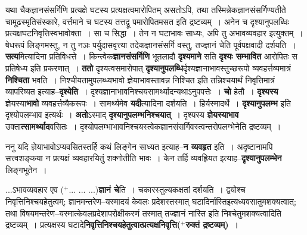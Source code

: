\documentclass[article,12pt,a4paper]{memoir}
\newcommand{\add}[1]{($^{+}$#1)}
\begin{document}
	यथा चैकज्ञानसंसर्गिणि प्रत्यक्षे घटस्य प्रत्यक्षत्वमारोपितम् असतोऽपि, तथा तस्मिन्नेकज्ञानसंसर्गिण्यतीते चामूढस्मृतिसंस्कारे, वर्त्तमाने च घटस्य तत्तद्रू पमारोपितमसत इति द्रष्टव्यम् । अनेन च दृश्यानुपलब्धिः प्रत्यक्षघटनिवृत्तिस्वभावोक्ता । सा च सिद्धा । तेन न घटाभावः साध्यः, अपि तु अभावव्यवहार इत्युक्तम् । षेधरूपं लिङ्गमस्तु, न तु नञः पर्युदासवृत्त्या तदेकज्ञानसंसर्गि वस्तु, तज्ज्ञानं चेति पूर्वपक्षवादी दर्शयति । \textbf{सत्य}मित्यादिना प्रतिविधत्ते । किन्त्वेक\textbf{ज्ञानसंसर्गिणि} भूतलादौ \textbf{दृश्यमाने} सति \textbf{दृश्यः सम्भावित} आरोपितः स प्रतिषेध्य इति प्रकरणात् । \textbf{ततो} दृश्यत्वसमारोपात् \textbf{दृश्यानुपलब्धि}र्दृश्यज्ञानाभावस्तुच्छरूपो व्यवहर्त्तव्यमात्रं \textbf{निश्चिता} भवति । निश्चीयतामुपलब्ध्यभावो ज्ञेयाभावस्तावन्न निश्चित इति तन्निश्चयार्थं निवृत्तिमात्रं व्यापरिष्यत इत्याह--\textbf{दृश्येति} । दृश्यज्ञानाभावनिश्चयसामर्थ्यादन्यथाऽनु\leavevmode{}पपत्तेः । \textbf{चो} हेतौ । \textbf{दृश्यस्य} ज्ञेयस्या\textbf{भावो} व्यवहर्त्तव्यैकरूपः । सामर्थ्यमेव \textbf{यदी}त्यादिना दर्शयति । हिर्यस्मादर्थे । \textbf{दृश्यानुपलम्भ} इति दृश्योपलम्भाव इत्यर्थः । \textbf{अतो}ऽस्माद् \textbf{दृश्यानुपलम्भनिश्चयात्} । दृश्यस्य \textbf{ज्ञेयस्याभाव} उक्ता\textbf{त्सामर्थ्याद}वसितः । दृश्योपलम्भाभावनिश्चयस्त्वेकज्ञानसंसर्गिवस्त्वन्तरोपलग्भेनेति द्रष्टव्यम् ।
	\pend
      

	  \pstart ननु यदि ज्ञेयाभावोऽप्यवसितस्तर्हि कथं लिङ्गेन साध्यत इत्याह--\textbf{न व्यवहृत} इति । अदृष्टानामपि सत्त्वशङ्कया न प्रत्यक्षं व्यवहारयितुं शक्नोतीति भावः । केन तर्हि व्यवह्रियत इत्याह--\textbf{दृश्यानुपलम्भेन} लिङ्गभूतेन ।
	\pend
      

	  \pstart {}...ऽभावव्यवहार एव \add{... ... ...}\textbf{ज्ञानं चे}ति । चकारस्तुल्यकक्षतां दर्शयति । द्वयोश्च निवृत्तिनिश्चयहेतुत्वम्; ज्ञानमन्तरेण--यस्मादयं केवलः प्रदेशस्तस्मात् घटादिर्नास्तिइत्यध्यवसातुमशक्यत्वात्; तथा विषयमन्तरेण--यस्मात्केवलप्रदेशापरोक्षीकरणं तस्मात् तज्ज्ञानं नास्ति इति निश्चेतुमशक्यत्वादिति द्रष्टव्यम् । प्रत्यक्षस्य घटादे\textbf{निवृत्तिनिश्चयहेतुत्वात्प्रत्यक्षनिवृत्ति\add{रुक्तं द्रष्टव्यम्}} ।
	\pend
      
\end{document}
